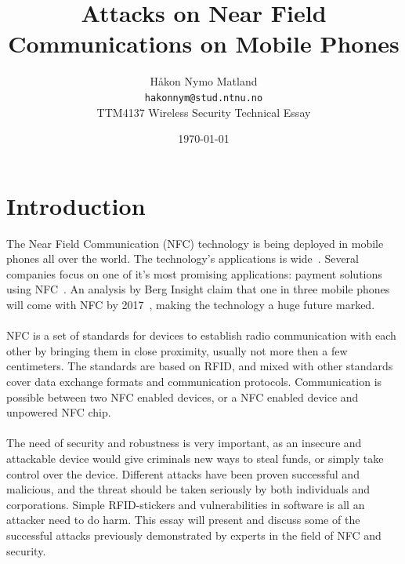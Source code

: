\documentclass[a4paper,11pt]{article}
\title{Attacks on Near Field Communications on Mobile Phones}
\author{Håkon Nymo Matland \\
	\texttt{hakonnym@stud.ntnu.no}\\
	TTM4137 Wireless Security Technical Essay}
\date{\today}
\begin{document}
\maketitle


\section{Introduction}
The Near Field Communication (NFC) technology is being deployed in mobile phones all over the world. The technology's applications is wide~\cite{remedios2006nfc}. Several companies focus on one of it's most promising applications: payment solutions using NFC~\cite{tan2013}. An analysis by Berg Insight claim that one in three mobile phones will come with NFC by 2017~\cite{nfc_growth}, making the technology a huge future marked.

\paragraph{}NFC is a set of standards for devices to establish radio communication with each other by bringing them in close proximity, usually not more then a few centimeters. The standards are based on RFID, and mixed with other standards cover data exchange formats and communication protocols. Communication is possible between two NFC enabled devices, or a NFC enabled device and unpowered NFC chip.

\paragraph{}The need of security and robustness is very important, as an insecure and attackable device would give criminals new ways to steal funds, or simply take control over the device. Different attacks have been proven successful and malicious, and the threat should be taken seriously by both individuals and corporations. Simple RFID-stickers and vulnerabilities in software is all an attacker need to do harm. This essay will present and discuss some of the successful attacks previously demonstrated by experts in the field of NFC and security.
\end{document}
